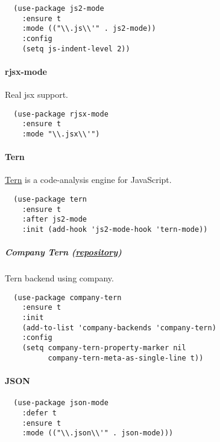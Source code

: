 \documentclass[11pt]{article}
\begin{document}
\begin{verbatim}
  (use-package js2-mode
    :ensure t
    :mode (("\\.js\\'" . js2-mode))
    :config
    (setq js-indent-level 2))
\end{verbatim}

\paragraph*{rjsx-mode}
\label{sec:org01eb4cf}
Real jsx support.

\begin{verbatim}
  (use-package rjsx-mode
    :ensure t
    :mode "\\.jsx\\'")
\end{verbatim}

\paragraph*{Tern}
\label{sec:orgd84b5ca}

\href{https://github.com/proofit404/company-tern}{Tern} is a code-analysis engine for JavaScript.

\begin{verbatim}
  (use-package tern
    :ensure t
    :after js2-mode
    :init (add-hook 'js2-mode-hook 'tern-mode))
\end{verbatim}

\subparagraph*{Company Tern (\href{https://github.com/proofit404/company-tern}{repository})}
\label{sec:org576125f}

Tern backend using company.

\begin{verbatim}
  (use-package company-tern
    :ensure t
    :init
    (add-to-list 'company-backends 'company-tern)
    :config
    (setq company-tern-property-marker nil
          company-tern-meta-as-single-line t))
\end{verbatim}

\paragraph*{JSON}
\label{sec:orgc3265b4}

\begin{verbatim}
  (use-package json-mode
    :defer t
    :ensure t
    :mode (("\\.json\\'" . json-mode)))
\end{verbatim}
\end{document}
